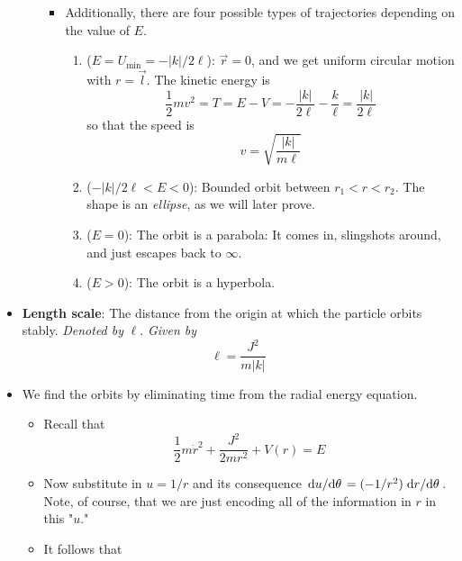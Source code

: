 \documentclass[../notes.tex]{subfiles}
\begin{document}
\begin{itemize}
\begin{itemize}
\begin{itemize}
            \item Additionally, there are four possible types of trajectories depending on the value of $E$.
            \begin{enumerate}
                \item ($E=U_\text{min}=-|k|/2\ell$): $\vec{r}=0$, and we get uniform circular motion with $r=\vec{l}$. The kinetic energy is
                \begin{equation*}
                    \frac{1}{2}mv^2 = T
                    = E-V
                    = -\frac{|k|}{2\ell}-\frac{k}{\ell}
                    = \frac{|k|}{2\ell}
                \end{equation*}
                so that the speed is
                \begin{equation*}
                    v = \sqrt{\frac{|k|}{m\ell}}
                \end{equation*}
                \item ($-|k|/2\ell<E<0$): Bounded orbit between $r_1<r<r_2$. The shape is an \emph{ellipse}, as we will later prove.
                \item ($E=0$): The orbit is a parabola: It comes in, slingshots around, and just escapes back to $\infty$.
                \item ($E>0$): The orbit is a hyperbola.
            \end{enumerate}
        \end{itemize}
    \end{itemize}
    \item \textbf{Length scale}: The distance from the origin at which the particle orbits stably. \emph{Denoted by} $\bm{\ell}$. \emph{Given by}
    \begin{equation*}
        \ell = \frac{J^2}{m|k|}
    \end{equation*}
    \item We find the orbits by eliminating time from the radial energy equation.
    \begin{itemize}
        \item Recall that
        \begin{equation*}
            \frac{1}{2}m\dot{r}^2+\frac{J^2}{2mr^2}+V(r) = E
        \end{equation*}
        \item Now substitute in $u=1/r$ and its consequence $\dv*{u}{\theta}=(-1/r^2)\dv*{r}{\theta}$. Note, of course, that we are just encoding all of the information in $r$ in this "$u$."
        \item It follows that

\end{itemize}
\end{itemize}
\end{document}
